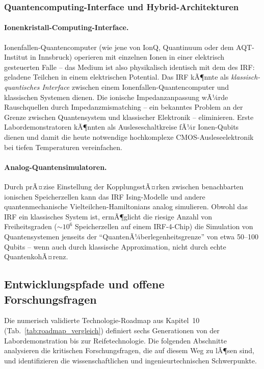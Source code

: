 ﻿\documentclass[a4paper,12pt]{scrreprt}
\theoremstyle{definition}
\begin{document}
\subsubsection{Quantencomputing-Interface und Hybrid-Architekturen}
\label{subsubsec:quantum}

\paragraph{Ionenkristall-Computing-Interface.}
Ionenfallen-Quantencomputer (wie jene von IonQ, Quantinuum oder dem
AQT-Institut in Innsbruck) operieren mit einzelnen Ionen in einer
elektrisch gesteuerten Falle -- das Medium ist also physikalisch identisch
mit dem des IRF: geladene Teilchen in einem elektrischen Potential.
Das IRF kÃ¶nnte als \emph{klassisch-quantisches Interface} zwischen einem
Ionenfallen-Quantencomputer und klassischen Systemen dienen. Die ionische
Impedanzanpassung wÃ¼rde Rauschquellen durch Impedanzmismatching
-- ein bekanntes Problem an der Grenze zwischen Quantensystem und
klassischer Elektronik -- eliminieren. Erste Labordemonstratoren
kÃ¶nnten als Ausleseschaltkreise fÃ¼r Ionen-Qubits dienen und
damit die heute notwendige hochkomplexe CMOS-Ausleseelektronik
bei tiefen Temperaturen vereinfachen.

\paragraph{Analog-Quantensimulatoren.}
Durch prÃ¤zise Einstellung der KopplungsstÃ¤rken zwischen benachbarten
ionischen Speicherzellen kann das IRF Ising-Modelle und andere
quantenmechanische Vielteilchen-Hamiltonians analog simulieren.
Obwohl das IRF ein klassisches System ist, ermÃ¶glicht die riesige
Anzahl von Freiheitsgraden ($\sim 10^6$ Speicherzellen auf einem
IRF-4-Chip) die Simulation von Quantensystemen jenseits der
``QuantenÃ¼berlegenheitsgrenze'' von etwa 50--100 Qubits -- wenn auch
durch klassische Approximation, nicht durch echte QuantenkohÃ¤renz.

\subsection{Entwicklungspfade und offene Forschungsfragen}
\label{sec:forschungsausblick}

Die numerisch validierte Technologie-Roadmap aus Kapitel~10
(Tab.~\ref{tab:roadmap_vergleich}) definiert sechs Generationen von
der Labordemonstration bis zur Reifetechnologie. Die folgenden
Abschnitte analysieren die kritischen Forschungsfragen, die auf
diesem Weg zu lÃ¶sen sind, und identifizieren die wissenschaftlichen
und ingenieurtechnischen Schwerpunkte.
\end{document}
